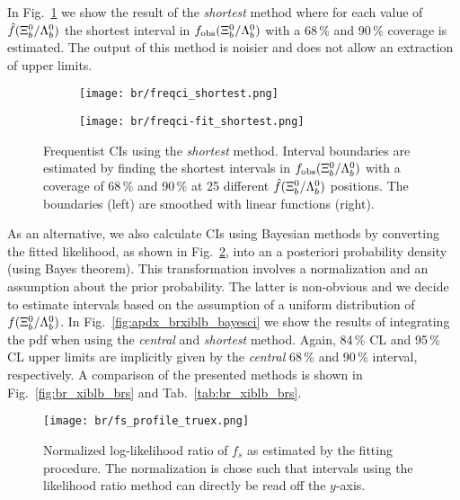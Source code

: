 In Fig.~\ref{fig:apdx_brxiblb_freqci_shortest} we show the result of the \textit{shortest} method where for each value of $\hat f({{\Xi}^0_{b}}/{{\Lambda}^0_{b}})$ the shortest interval in $f_\text{obs}({{\Xi}^0_{b}}/{{\Lambda}^0_{b}})$ with a 68\,\% and 90\,\% coverage is estimated.
The output of this method is noisier and does not allow an extraction of upper limits.
\begin{figure}[htbp]
    \centering
    \begin{subfigure}{.49\textwidth}
        \centering
        \texttt{[image: br/freqci\_shortest.png]}
    \end{subfigure}
    \begin{subfigure}{.49\textwidth}
        \centering
        \texttt{[image: br/freqci-fit\_shortest.png]}
    \end{subfigure}
    \caption{Frequentist CIs using the \textit{shortest} method. Interval boundaries are estimated by finding the shortest intervals in $f_\text{obs}({{\Xi}^0_{b}}/{{\Lambda}^0_{b}})$ with a coverage of 68\,\% and 90\,\% at 25 different $\hat f({{\Xi}^0_{b}}/{{\Lambda}^0_{b}})$ positions. The boundaries (left) are smoothed with linear functions (right).}
    \label{fig:apdx_brxiblb_freqci_shortest}
\end{figure}

As an alternative, we also calculate CIs using Bayesian methods by converting the fitted likelihood, as shown in Fig.~\ref{fig:apdx_brxiblb_likelihood}, into an a posteriori probability density (using Bayes theorem).
This transformation involves a normalization and an assumption about the prior probability.
The latter is non-obvious and we decide to estimate intervals based on the assumption of a uniform distribution of $f({{\Xi}^0_{b}}/{{\Lambda}^0_{b}})$.
In Fig.~\ref{fig:apdx_brxiblb_bayesci} we show the results of integrating the \gls{pdf} when using the \textit{central} and \textit{shortest} method.
Again, 84\,\% CL and 95\,\% CL upper limits are implicitly given by the \textit{central} 68\,\% and 90\,\% interval, respectively.
A comparison of the presented methods is shown in Fig.~\ref{fig:br_xiblb_brs} and Tab.~\ref{tab:br_xiblb_brs}.

\begin{figure}[htbp]
    \centering
    \texttt{[image: br/fs\_profile\_truex.png]}
    \caption{Normalized log-likelihood ratio of $f_s$ as estimated by the fitting procedure. The normalization is chose such that intervals using the likelihood ratio method can directly be read off the $y$-axis.}
    \label{fig:apdx_brxiblb_likelihood}
\end{figure}

